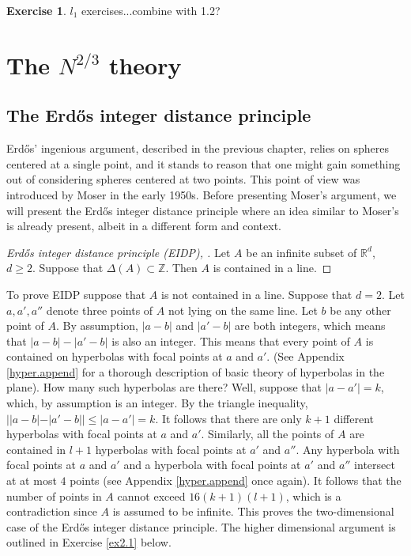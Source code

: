 \documentclass[]{stml-l}
\numberwithin{equation}{chapter}
\theoremstyle{plain}
\theoremstyle{definition}
\newtheorem{exercise}{Exercise}[chapter]
\theoremstyle{remark}
\begin{document}
\begin{exercise} \label{ex1.6}
$l_1$ exercises...combine with 1.2?
\end{exercise}

\chapter{The $N^{2/3}$ theory}



\section{The Erd\H{o}s integer distance principle} 

Erd\H{o}s' ingenious argument, described in the previous chapter,
relies on spheres centered at a single point, and it stands to
reason that one might gain something out of considering spheres
centered at two points. This point of view was introduced by Moser
in the early 1950s. Before presenting Moser's argument, we will
present the Erd\H{o}s integer distance principle where an idea similar
to Moser's is already present, albeit in a different form and
context.

\begin{proof}[Erd\H{o}s integer distance principle (EIDP), \cite{Erd2}] Let $A$ be an
infinite subset of $\mathbb{R}^d$, $d \ge 2$. Suppose that
$\Delta(A) \subset \mathbb{Z}$. Then $A$ is contained in a line.
\end{proof}

To prove EIDP suppose that $A$ is not contained in a line. Suppose
that $d=2$. Let $a,a',a''$ denote three points of $A$ not lying on
the same line. Let $b$ be any other point of $A$. By assumption,
$|a-b|$ and $|a'-b|$ are both integers, which means that
$|a-b|-|a'-b|$ is also an integer. This means that every point of
$A$ is contained on hyperbolas with focal points at $a$ and $a'$.
(See Appendix \ref{hyper.append} for a thorough description of basic theory of
hyperbolas in the plane). How many such hyperbolas are there?
Well, suppose that $|a-a'|=k$, which, by assumption is an integer.
By the triangle inequality, $||a-b|-|a'-b|| \leq |a-a'|=k$. It
follows that there are only $k+1$ different hyperbolas with focal
points at $a$ and $a'$. Similarly, all the points of $A$ are
contained in $l+1$ hyperbolas with focal points at $a'$ and $a''$.
Any hyperbola with focal points at $a$ and $a'$ and a hyperbola
with focal points at $a'$ and $a''$ intersect at at most $4$
points (see Appendix \ref{hyper.append} once again). It follows that the number of
points in $A$ cannot exceed $16(k+1)(l+1)$, which is a
contradiction since $A$ is assumed to be infinite. This proves the
two-dimensional case of the Erd\H{o}s integer distance principle. The
higher dimensional argument is outlined in Exercise \ref{ex2.1} below.
\end{document}
